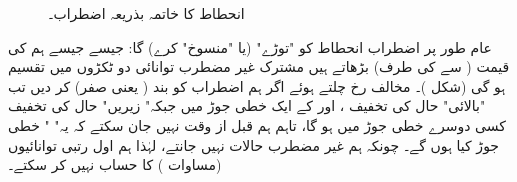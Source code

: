 \begin{figure}
\centering
{}
\caption{انحطاط کا خاتمہ بذریعہ اضطراب۔}
\label{شکل_غیر_تابع_اضطراب_اختتام_انحطاط}
\end{figure}


عام طور پر اضطراب  انحطاط کو "توڑے"  (یا "منسوخ" کرے) گا:  جیسے جیسے ہم  کی قیمت (  سے   کی طرف) بڑھاتے ہیں مشترک غیر مضطرب توانائی  دو ٹکڑوں میں تقسیم ہو گی   (شکل  )۔ مخالف رخ  چلتے ہوئے اگر ہم اضطراب کو بند (  یعنی صفر)  کر دیں تب "بالائی"  حال کی تخفیف ،   اور  کے  ایک خطی جوڑ میں  جبکہ" زیریں" حال کی تخفیف کسی دوسرے   خطی جوڑ میں ہو گا،   تاہم ہم قبل از وقت نہیں جان سکتے  کہ یہ" " خطی جوڑ کیا ہوں گے۔ چونکہ ہم غیر مضطرب حالات نہیں جانتے،   لہٰذا    ہم اول رتبی توانائیوں  (مساوات  ) کا حساب نہیں کر سکتے۔ 

